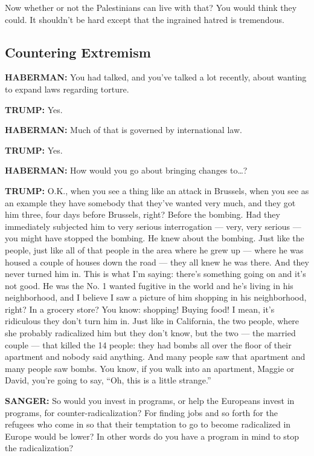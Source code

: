 Now whether or not the Palestinians can live with that? You would think
they could. It shouldn't be hard except that the ingrained hatred is
tremendous.

\hypertarget{countering-extremism}{%
\subsection{Countering Extremism}\label{countering-extremism}}

\textbf{HABERMAN:} You had talked, and you've talked a lot recently,
about wanting to expand laws regarding torture.

\textbf{TRUMP:} Yes.

\textbf{HABERMAN:} Much of that is governed by international law.

\textbf{TRUMP:} Yes.

\textbf{HABERMAN:} How would you go about bringing changes to\ldots{}?

\textbf{TRUMP:} O.K., when you see a thing like an attack in Brussels,
when you see as an example they have somebody that they've wanted very
much, and they got him three, four days before Brussels, right? Before
the bombing. Had they immediately subjected him to very serious
interrogation --- very, very serious --- you might have stopped the
bombing. He knew about the bombing. Just like the people, just like all
of that people in the area where he grew up --- where he was housed a
couple of houses down the road --- they all knew he was there. And they
never turned him in. This is what I'm saying: there's something going on
and it's not good. He was the No. 1 wanted fugitive in the world and
he's living in his neighborhood, and I believe I saw a picture of him
shopping in his neighborhood, right? In a grocery store? You know:
shopping! Buying food! I mean, it's ridiculous they don't turn him in.
Just like in California, the two people, where she probably radicalized
him but they don't know, but the two --- the married couple --- that
killed the 14 people: they had bombs all over the floor of their
apartment and nobody said anything. And many people saw that apartment
and many people saw bombs. You know, if you walk into an apartment,
Maggie or David, you're going to say, ``Oh, this is a little strange.''

\textbf{SANGER:} So would you invest in programs, or help the Europeans
invest in programs, for counter-radicalization? For finding jobs and so
forth for the refugees who come in so that their temptation to go to
become radicalized in Europe would be lower? In other words do you have
a program in mind to stop the radicalization?

